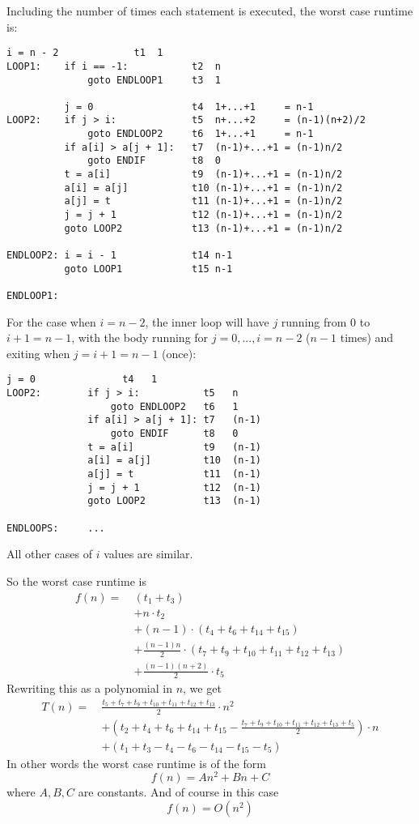 Including the number of times each statement is executed,
the worst case runtime is:
\begin{Verbatim}[frame=single, fontsize=\footnotesize]
          i = n - 2             t1  1
LOOP1:    if i == -1:           t2  n
              goto ENDLOOP1     t3  1
                                
          j = 0                 t4  1+...+1     = n-1
LOOP2:    if j > i:             t5  n+...+2     = (n-1)(n+2)/2
              goto ENDLOOP2     t6  1+...+1     = n-1
          if a[i] > a[j + 1]:   t7  (n-1)+...+1 = (n-1)n/2
              goto ENDIF        t8  0 
          t = a[i]              t9  (n-1)+...+1 = (n-1)n/2
          a[i] = a[j]           t10 (n-1)+...+1 = (n-1)n/2
          a[j] = t              t11 (n-1)+...+1 = (n-1)n/2
          j = j + 1             t12 (n-1)+...+1 = (n-1)n/2
          goto LOOP2            t13 (n-1)+...+1 = (n-1)n/2

ENDLOOP2: i = i - 1             t14 n-1
          goto LOOP1            t15 n-1

ENDLOOP1:
\end{Verbatim}

For the case when $i = n - 2$, the inner loop 
will have $j$ running from $0$ to $i + 1 = n - 1$,
with the body running for $j = 0, ..., i = n - 2$ ($n - 1$ times) and 
exiting when $j = i + 1 = n - 1$ (once):
\begin{Verbatim}[frame=single, fontsize=\footnotesize]
              j = 0               t4   1
LOOP2:        if j > i:           t5   n
                  goto ENDLOOP2   t6   1
              if a[i] > a[j + 1]: t7   (n-1)
                  goto ENDIF      t8   0
              t = a[i]            t9   (n-1)
              a[i] = a[j]         t10  (n-1)
              a[j] = t            t11  (n-1)
              j = j + 1           t12  (n-1)
              goto LOOP2          t13  (n-1)

ENDLOOPS:     ...
\end{Verbatim}
All other cases of $i$ values are similar.

So the worst case runtime is
\begin{align*}
f(n) = \
& (t_1 + t_3) \\
&+ n \cdot t_2 \\
&+ (n-1) \cdot (t_4 + t_6 + t_{14} + t_{15}) \\
&+ \frac{(n-1)n}{2} \cdot (t_{7} + t_{9} + t_{10} + t_{11} + t_{12} + t_{13}) \\
&+ \frac{(n-1)(n+2)}{2} \cdot t_5
\end{align*}
Rewriting this as a polynomial in $n$, we get
\begin{align*}
T(n) = \
&\frac{t_5 + t_7 + t_9 + t_{10} + t_{11} + t_{12} + t_{13}}{2} \cdot  n^2 \\
&+ \left(
   t_2 + t_4 + t_6 + t_{14} + t_{15}
   - \frac{t_7 + t_9 + t_{10} + t_{11} + t_{12} + t_{13} + t_5}{2}
   \right) \cdot n  \\
&+ \left(
   t_1 + t_3 - t_4 - t_6 - t_{14} - t_{15}- t_5 
   \right)
\end{align*}
In other words the worst case runtime is of the form
\[
f(n) = An^2 + Bn + C
\]
where $A,B,C$ are constants.
And of course in this case
\[
f(n) = O(n^2)
\]

